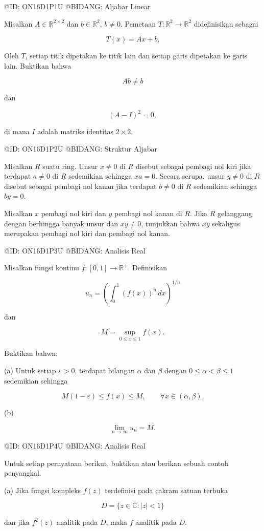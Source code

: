 @ID: ON16D1P1U
@BIDANG: Aljabar Linear

Misalkan $A\in\mathbb R^{2\times2}$ dan $b\in\mathbb R^2$, $b\ne0$. Pemetaan $T:\mathbb R^2\to\mathbb R^2$ didefinisikan sebagai

$$
T(x)=Ax+b.
$$

Oleh $T$, setiap titik dipetakan ke titik lain dan setiap garis dipetakan ke garis lain. Buktikan bahwa

$$
Ab\ne b
$$

dan

$$
(A-I)^2=0,
$$

di mana $I$ adalah matriks identitas $2\times2$.

@ID: ON16D1P2U
@BIDANG: Struktur Aljabar

Misalkan $R$ suatu ring. Unsur $x\ne0$ di $R$ disebut sebagai pembagi nol kiri jika terdapat $a\ne0$ di $R$ sedemikian sehingga $xa=0$. Secara serupa, unsur $y\ne0$ di $R$ disebut sebagai pembagi nol kanan jika terdapat $b\ne0$ di $R$ sedemikian sehingga $by=0$.

Misalkan $x$ pembagi nol kiri dan $y$ pembagi nol kanan di $R$. Jika $R$ gelanggang dengan berhingga banyak unsur dan $xy\ne0$, tunjukkan bahwa $xy$ sekaligus merupakan pembagi nol kiri dan pembagi nol kanan.

@ID: ON16D1P3U
@BIDANG: Analisis Real

Misalkan fungsi kontinu $f:[0,1]\to\mathbb R^+$. Definisikan

$$
u_n=\left(\int_0^1(f(x))^n\,dx\right)^{1/n}
$$

dan

$$
M=\sup_{0\le x\le1}f(x).
$$

Buktikan bahwa:

(a) Untuk setiap $\varepsilon>0$, terdapat bilangan $\alpha$ dan $\beta$ dengan $0\le\alpha<\beta\le1$ sedemikian sehingga

$$
M(1-\varepsilon)\le f(x)\le M,\qquad \forall x\in(\alpha,\beta).
$$

(b)

$$
\lim_{n\to\infty}u_n=M.
$$

@ID: ON16D1P4U
@BIDANG: Analisis Real

Untuk setiap pernyataan berikut, buktikan atau berikan sebuah contoh penyangkal.

(a) Jika fungsi kompleks $f(z)$ terdefinisi pada cakram satuan terbuka

$$
D=\{z\in\mathbb C:|z|<1\}
$$

dan jika $f^2(z)$ analitik pada $D$, maka $f$ analitik pada $D$.

